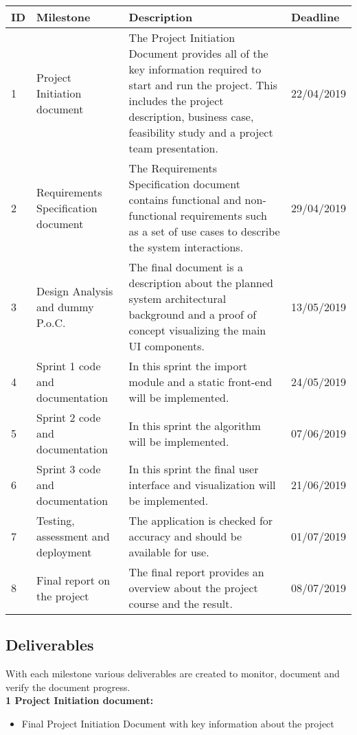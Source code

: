 \documentclass[notitlepage]{article}
\begin{document}
\begin{flushleft}
\begin{center}
  \begin{tabular}{ m{0.4cm} m{5cm} m{8.5cm} m{2cm} }
  	\hline
		ID & Milestone & Description & Deadline \\ \hline
		1 & Project Initiation document & The Project Initiation Document provides all of the key information required to start and run the project. This includes the project description, business case, feasibility study and a project team presentation.  & 22/04/2019 \\ \hline
		2 & Requirements Specification document & The Requirements Specification document contains functional and non-functional requirements such as a set of use cases to describe the system interactions. & 29/04/2019 \\ \hline
		3 & Design Analysis and dummy P.o.C. & The final document is a description about the planned system architectural background and a proof of concept visualizing the main UI components. & 13/05/2019 \\ \hline
		4 & Sprint 1 code and documentation & In this sprint the import module and a static front-end will be implemented.  & 24/05/2019 \\ \hline
		5 & Sprint 2 code and documentation & In this sprint the algorithm will be implemented. & 07/06/2019 \\ \hline
		6 & Sprint 3 code and documentation & In this sprint the final user interface and visualization will be implemented. & 21/06/2019 \\ \hline
		7 & Testing, assessment and deployment & The application is checked for accuracy and should be available for use. & 01/07/2019 \\ \hline
		8 & Final report on the project & The final report provides an overview about the project course and the result. & 08/07/2019 \\ \hline
	\end{tabular}
\end{center}

 

\subsection{Deliverables}
With each milestone various deliverables are created to monitor, document and verify the document progress.\\
\medskip
\textbf{1 Project Initiation document:}
\\
\begin{itemize}
	\item Final Project Initiation Document with key information about the project
\end{itemize}


\end{flushleft}
\end{document}
